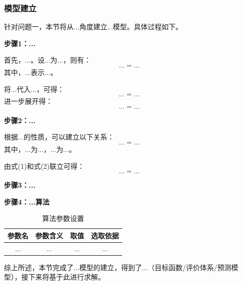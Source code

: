 
\subsubsection{模型建立}

针对问题一，本节将从...角度建立...模型。具体过程如下。

\textbf{步骤1：...}

首先，...。设...为...，则有：
\begin{equation}
    ... = ...
\end{equation}
其中，$...$表示...。

将...代入...，可得：
\begin{equation}
    ... = ...
\end{equation}
进一步展开得：
\begin{equation}
    ... = ...
\end{equation}

\textbf{步骤2：...}

根据...的性质，可以建立以下关系：
\begin{equation}
    ... = ...
\end{equation}
其中，$...$为...，$...$为...。

由式(1)和式(2)联立可得：
\begin{equation}
    ... = ...
\end{equation}

\textbf{步骤3：...}


\textbf{步骤4：...算法}


\begin{table}[H]
  \centering
  \caption{算法参数设置}
  \begin{tabularx}{\textwidth}{CCCC}
    \toprule
    参数名 & 参数含义 & 取值 & 选取依据 \\
    \midrule
    ... & ... & ... & ... \\
    \bottomrule
  \end{tabularx}
  \label{tab:参数1}
\end{table}

综上所述，本节完成了...模型的建立，得到了...（目标函数/评价体系/预测模型），接下来将基于此进行求解。

